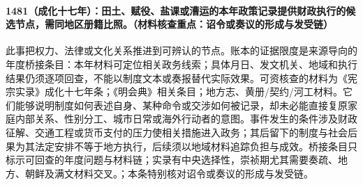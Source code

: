 \paragraph{1481（成化十七年）：田土、赋役、盐课或漕运的本年政策记录提供财政执行的候选节点，需同地区册籍比照。（材料核查重点：诏令或奏议的形成与发受链）} 此事把权力、法律或文化关系推进到可辨认的节点。账本的证据限度是来源导向的年度桥接条目：本年材料可定位相关政务线索；具体月日、发文机关、地域和执行结果仍须逐项回查，不能以制度文本或奏报替代实际效果。可资核查的材料为《宪宗实录》成化十七年条；《明会典》相关条目；地方志、黄册/契约/河工材料。它们能够说明制度如何表述自身、某种命令或交涉如何被记录，却未必能直接复原家庭内部关系、性别分工、城市日常或海外行动者的意图。事件发生的条件涉及财政征解、交通工程或货币支付的压力使相关措施进入政务；其后留下的制度与社会后果为其法定安排不等于地方执行，后续须以地域材料追踪负担与成效。桥接条目只标示可回查的年度问题与材料链；实录有中央选择性，崇祯期尤其需要奏疏、地方、朝鲜及满文材料交叉。；本条特别核对诏令或奏议的形成与发受链。
